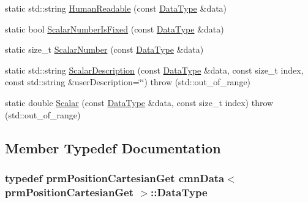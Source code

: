 \begin{DoxyCompactItemize}
\item 
static std\+::string \hyperlink{classcmn_data_3_01prm_position_cartesian_get_01_4_ab302aecf9c91047598d6ce8a4dd965c3}{Human\+Readable} (const \hyperlink{classcmn_data_3_01prm_position_cartesian_get_01_4_a4c0c73a046fbb0962651979bd5734bbd}{Data\+Type} \&data)
\item 
static bool \hyperlink{classcmn_data_3_01prm_position_cartesian_get_01_4_af1314fdbe2d70473e7baf754bada2989}{Scalar\+Number\+Is\+Fixed} (const \hyperlink{classcmn_data_3_01prm_position_cartesian_get_01_4_a4c0c73a046fbb0962651979bd5734bbd}{Data\+Type} \&data)
\item 
static size\+\_\+t \hyperlink{classcmn_data_3_01prm_position_cartesian_get_01_4_a45f1344acdd79e6dfca23ee5cad90485}{Scalar\+Number} (const \hyperlink{classcmn_data_3_01prm_position_cartesian_get_01_4_a4c0c73a046fbb0962651979bd5734bbd}{Data\+Type} \&data)
\item 
static std\+::string \hyperlink{classcmn_data_3_01prm_position_cartesian_get_01_4_ab13b91fab6c9b8a2f84869e12942498c}{Scalar\+Description} (const \hyperlink{classcmn_data_3_01prm_position_cartesian_get_01_4_a4c0c73a046fbb0962651979bd5734bbd}{Data\+Type} \&data, const size\+\_\+t index, const std\+::string \&user\+Description=\char`\"{}\char`\"{})  throw (std\+::out\+\_\+of\+\_\+range)
\item 
static double \hyperlink{classcmn_data_3_01prm_position_cartesian_get_01_4_a578074d27b2cbac35a428f7bef5ef07e}{Scalar} (const \hyperlink{classcmn_data_3_01prm_position_cartesian_get_01_4_a4c0c73a046fbb0962651979bd5734bbd}{Data\+Type} \&data, const size\+\_\+t index)  throw (std\+::out\+\_\+of\+\_\+range)
\end{DoxyCompactItemize}


\subsection{Member Typedef Documentation}
\hypertarget{classcmn_data_3_01prm_position_cartesian_get_01_4_a4c0c73a046fbb0962651979bd5734bbd}{}
\subsubsection[{Data\+Type}]{\setlength{\rightskip}{0pt plus 5cm}typedef {\bf prm\+Position\+Cartesian\+Get} {\bf cmn\+Data}$<$ {\bf prm\+Position\+Cartesian\+Get} $>$\+::{\bf Data\+Type}}\label{classcmn_data_3_01prm_position_cartesian_get_01_4_a4c0c73a046fbb0962651979bd5734bbd}


